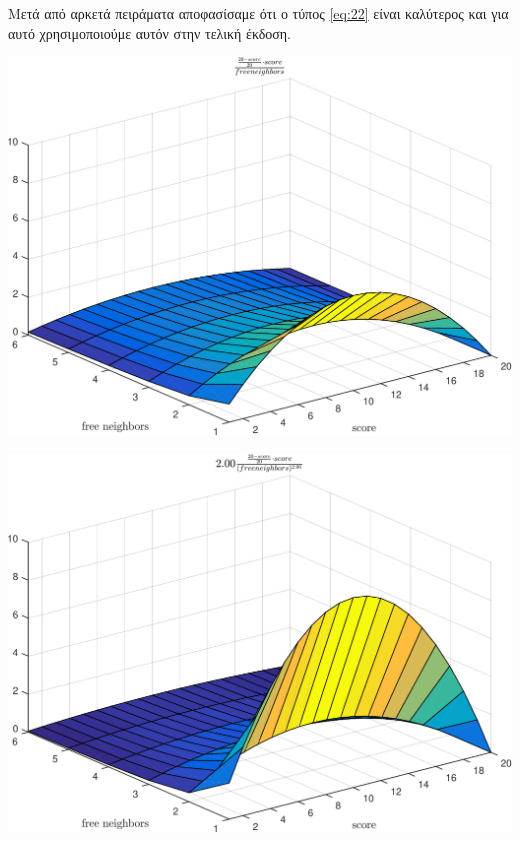 \begin{itemize}
Μετά από αρκετά πειράματα αποφασίσαμε ότι ο τύπος \hyperref[eq:22]{\ref{eq:22}} είναι καλύτερος και για αυτό χρησιμοποιούμε αυτόν στην τελική έκδοση.
\noindent\begin{center}
    \centering
    \noindent\begin{minipage}{\textwidth}
        \centering
        \includegraphics[height=0.45\textheight]{img/11.pdf}
    \end{minipage} %
    \vfill
    \noindent\begin{minipage}{\textwidth}
        \centering
        \includegraphics[height=0.45\textheight]{img/22.pdf}
    \end{minipage} %
\end{center}


\end{itemize}

